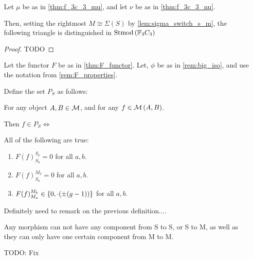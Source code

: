 \begin{lemma} \label{lem:s_m_s_distinguished}
    Let \( \mu \) be as in \autoref{thm:f_3c_3_mu}, and let \( \nu \) be as in \autoref{thm:f_3c_3_nu}.

    Then, setting the rightmost \( M \cong \Sigma(S) \) by \autoref{lem:sigma_switch_s_m}, the following triangle is distinguished in \( \operatorname{Stmod}\left(  {\mathbb{F}}_3C_3  \right) \)
    \begin{center}
    \end{center}
\end{lemma}
\begin{proof}
    TODO
\end{proof}

\begin{definition} \label{def:unholy} %
    Let the functor \( F \) be as in \autoref{thm:F_functor}.  Let, \( \phi \) be as in \autoref{rem:big_iso}, and use the notation from \autoref{rem:F_properties}.

    Define the set \( P_S \) as follows:

    For any object \( A, B \in {\mathcal{M}} \), and for any \( f \in {\mathcal{M}}\left( A, B \right) \).

    Then \( f \in P_S \iff \)

    All of the following are true:
    \begin{enumerate}
        \item \( F(f)_{S_a}^{S_b} = 0 \) for all \( a, b \).
        \item \( F(f)_{S_a}^{M_b} = 0 \) for all  \( a, b \).
        \item \( F(f)_{M_a}^{M_b} \in \left\{ 0, \cdot(\pm (g - 1)) \right\} \) for all \( a, b \).
    \end{enumerate}
\end{definition}

\begin{remark}
    Definitely need to remark on the previous definition.... 
    
    Any morphism can not have any component from S to S, or S to M, as well as they can only have one certain component from M to M.

    TODO: Fix
\end{remark}

